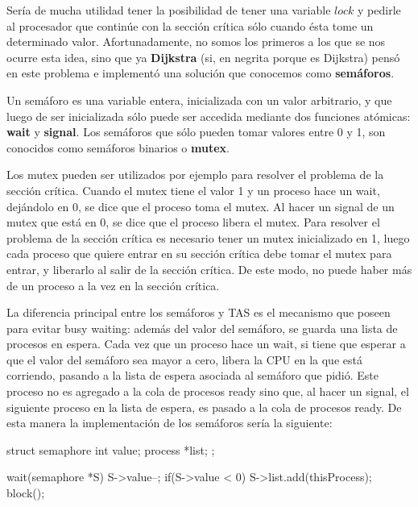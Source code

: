\documentclass{article}
\begin{document}
Ser\'ia de mucha utilidad tener la posibilidad de tener una variable $lock$ y pedirle al procesador que contin\'ue con la secci\'on cr\'itica s\'olo cuando \'esta tome un determinado valor. Afortunadamente, no somos los primeros a los que se nos ocurre esta idea, sino que ya \textbf{Dijkstra} (si, en negrita porque es Dijkstra) pens\'o en este problema e implement\'o una soluci\'on que conocemos como \textbf{sem\'aforos}.

Un sem\'aforo es una variable entera, inicializada con un valor arbitrario, y que luego de ser inicializada s\'olo puede ser accedida mediante dos funciones atómicas: \textbf{wait} y \textbf{signal}. Los semáforos que s\'olo pueden tomar valores entre 0 y 1, son conocidos como sem\'aforos binarios o \textbf{mutex}.

Los mutex pueden ser utilizados por ejemplo para resolver el problema de la secci\'on cr\'itica. Cuando el mutex tiene el valor 1 y un proceso hace un wait, dej\'andolo en 0, se dice que el proceso toma el mutex. Al hacer un signal de un mutex que est\'a en 0, se dice que el proceso libera el mutex. Para resolver el problema de la secci\'on cr\'itica es necesario tener un mutex inicializado en 1, luego cada proceso que quiere entrar en su secci\'on cr\'itica debe tomar el mutex para entrar, y liberarlo al salir de la secci\'on cr\'itica. De este modo, no puede haber m\'as de un proceso a la vez en la secci\'on cr\'itica.

La diferencia principal entre los semáforos y TAS es el mecanismo que poseen para evitar busy waiting: adem\'as del valor del sem\'aforo, se guarda una lista de procesos en espera. Cada vez que un proceso hace un wait, si tiene que esperar a que el valor del sem\'aforo sea mayor a cero, libera la CPU en la que est\'a corriendo, pasando a la lista de espera asociada al sem\'aforo que pidi\'o. Este proceso no es agregado a la cola de procesos ready sino que, al hacer un signal, el siguiente proceso en la lista de espera, es pasado a la cola de procesos ready. De esta manera la implementaci\'on de los sem\'aforos ser\'ia la siguiente:

\begin{code}
struct semaphore{
    int value;
		process *list;
};
\end{code}

\newpage
\begin{code}
wait(semaphore *S)
{
    S->value--;
		if(S->value < 0)
		{
		    S->list.add(thisProcess);
				block();
		}
}
\end{code}
\end{document}
